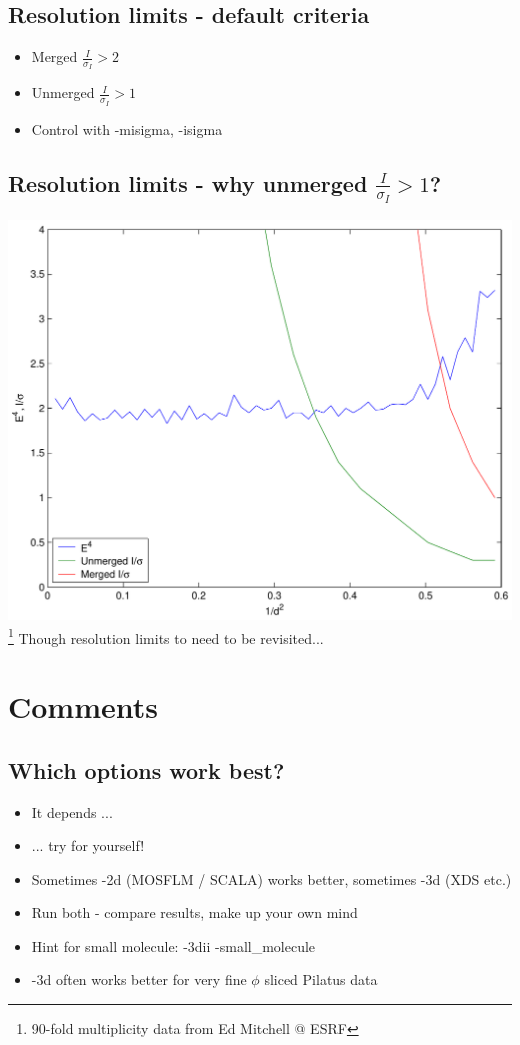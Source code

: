 \documentclass[a4paper, 11pt]{article}
\begin{document}
\subsection{Resolution limits - default criteria}
\begin{itemize}
\item{Merged $\frac{I}{\sigma_I} > 2$}
\item{Unmerged $\frac{I}{\sigma_I} > 1$}
\item{Control with -misigma, -isigma}
\end{itemize}

\subsection{Resolution limits - why unmerged $\frac{I}{\sigma_I} > 1$?}
\includegraphics[scale=0.5]{figures/plat-13A-z4.pdf}
\footnote{90-fold multiplicity data from Ed Mitchell @ ESRF}
Though resolution limits to need to be revisited...

\section{Comments}

\subsection{Which options work best?}
\begin{itemize}
\item{It depends ...}
\item{... try for yourself!}
\item{Sometimes -2d (MOSFLM / SCALA) works better, sometimes -3d (XDS etc.)}
\item{Run both - compare results, make up your own mind}
\item{Hint for small molecule: -3dii -small\_molecule}
\item{-3d often works better for very fine $\phi$ sliced Pilatus data}
\end{itemize}
\end{document}
